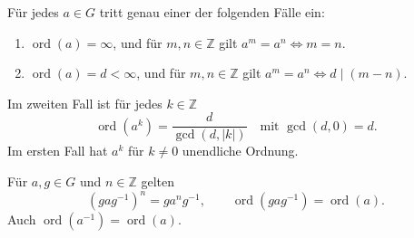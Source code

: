 \begin{theorem}
Für jedes \(a\in G\) tritt genau einer der folgenden Fälle ein:
\begin{enumerate}
\item \(\operatorname{ord}(a)=\infty\), und für \(m,n\in\mathbb Z\) gilt
\(a^m=a^n\iff m=n\).
\item \(\operatorname{ord}(a)=d<\infty\), und für \(m,n\in\mathbb Z\) gilt
\(a^m=a^n\iff d\mid(m-n)\).
\end{enumerate}
Im zweiten Fall ist für jedes \(k\in\mathbb Z\)
\[
 \operatorname{ord}(a^k)=\frac{d}{\gcd(d,|k|)}
 \quad\text{mit }\gcd(d,0)=d.
\]
Im ersten Fall hat \(a^k\) für \(k\ne0\) unendliche Ordnung.
\cite{milne}
\end{theorem}

\begin{theorem}
Für \(a,g\in G\) und \(n\in\mathbb Z\) gelten
\[
 (gag^{-1})^n=ga^ng^{-1},\qquad
 \operatorname{ord}(gag^{-1})=\operatorname{ord}(a).
\]
Auch \(\operatorname{ord}(a^{-1})=\operatorname{ord}(a)\).
\cite{milne}
\end{theorem}

